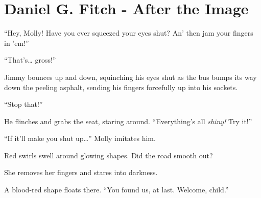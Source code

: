 \hypertarget{daniel-g.-fitch---after-the-image}{%
\section{Daniel G. Fitch - After the
Image}\label{daniel-g.-fitch---after-the-image}}

``Hey, Molly! Have you ever squeezed your eyes shut? An' then jam your
fingers in 'em!''

``That's\ldots{} gross!''

Jimmy bounces up and down, squinching his eyes shut as the bus bumps its
way down the peeling asphalt, sending his fingers forcefully up into his
sockets.

``Stop that!''

He flinches and grabs the seat, staring around. ``Everything's all
\emph{shiny!} Try it!''

``If it'll make you shut up\ldots{}'' Molly imitates him.

Red swirls swell around glowing shapes. Did the road smooth out?

She removes her fingers and stares into darkness.

A blood-red shape floats there. ``You found us, at last. Welcome,
child.''
